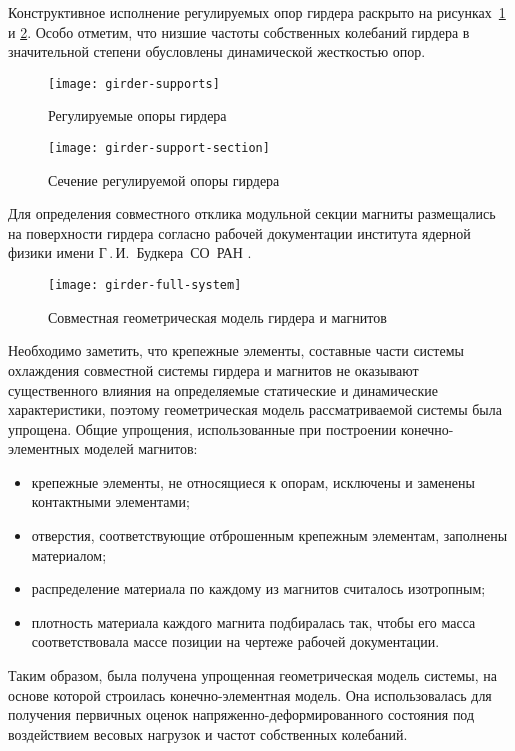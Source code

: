 Конструктивное исполнение регулируемых опор гирдера раскрыто на рисунках~\ref{fig:girder-supports} и \ref{fig:girder-support-section}. Особо отметим, что низшие частоты собственных колебаний гирдера в значительной степени обусловлены динамической жесткостью опор.

\begin{figure}[!htb]
	\centering
	\texttt{[image: girder-supports]}
	\caption{Регулируемые опоры гирдера} \label{fig:girder-supports}
\end{figure}

\begin{figure}[!htb]
	\centering
	\texttt{[image: girder-support-section]}
	\caption{Сечение регулируемой опоры гирдера} \label{fig:girder-support-section}
\end{figure}

Для определения совместного отклика модульной секции магниты размещались на поверхности гирдера согласно рабочей документации института ядерной физики имени Г\,.\,И.~Будкера~СО~РАН .

\begin{figure}[!htb]
	\centering
	\texttt{[image: girder-full-system]}
	\caption{Совместная геометрическая модель гирдера и магнитов} \label{fig:girder-full-system}
\end{figure}

Необходимо заметить, что крепежные элементы, составные части системы охлаждения совместной системы гирдера и магнитов не оказывают существенного влияния на определяемые статические и динамические характеристики, поэтому геометрическая модель рассматриваемой системы была упрощена. Общие упрощения, использованные при построении конечно-элементных моделей магнитов:
\begin{itemize}
	\item крепежные элементы, не относящиеся к опорам, исключены и заменены контактными элементами;
	\item отверстия, соответствующие отброшенным крепежным элементам, заполнены материалом;
	\item распределение материала по каждому из магнитов считалось изотропным;
	\item плотность материала каждого магнита подбиралась так, чтобы его масса соответствовала массе позиции на чертеже рабочей документации.
\end{itemize} 

Таким образом, была получена упрощенная геометрическая модель системы, на основе которой строилась конечно-элементная модель. Она использовалась для получения первичных оценок напряженно-деформированного состояния под воздействием весовых нагрузок и частот собственных колебаний. 

